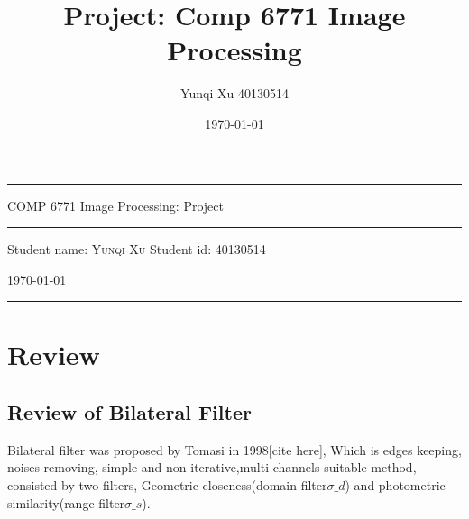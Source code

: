 \documentclass[12pt]{article}
\title{Project: Comp 6771 Image Processing}
\author{Yunqi Xu 40130514}
\date{\today}
\begin{document}
\begin{titlepage}
  \rule{\textwidth}{1pt}   %
    \vspace{0.2\textheight}  %


    {\Huge COMP 6771 Image Processing: Project}

    \vspace{0.025\textheight}   %

    \rule{0.83\textwidth}{0.4pt}  %

    \vspace{0.1\textheight}  %


    {\Large Student name: \textsc{Yunqi Xu}}
    \vfill
    {\Large Student id: 40130514}
    \vfill  %

    {\large \today}
    \vspace{0.1\textheight}  %


    \rule{\textwidth}{1pt}  %
\end{titlepage}

\section{Review}
\subsection{Review of Bilateral Filter}
\label{subsection review bilateral}
Bilateral filter was proposed by Tomasi in 1998[cite here], Which is edges keeping, noises removing, simple and non-iterative,multi-channels suitable method, consisted by two filters, Geometric closeness(domain filter$\sigma\_d$) and photometric similarity(range filter$\sigma\_s$).  
\end{document}
